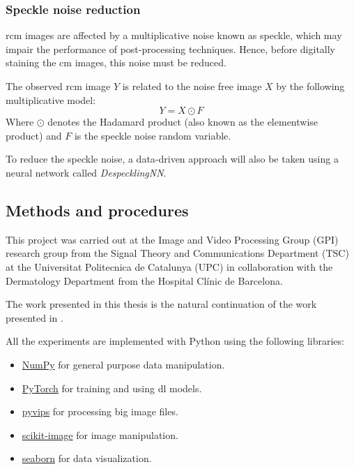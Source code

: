 \documentclass[../main.tex]{subfiles}
\begin{document}
\subsubsection{Speckle noise reduction}\label{sec:speckle-noise}
\gls{rcm} images are affected by a multiplicative noise known as speckle,
which may impair the performance of post-processing techniques.
Hence, before digitally staining the \gls{cm} images, this noise must be reduced.

The observed \gls{rcm} image $Y$ is related to the noise free image $X$ by
the following multiplicative model:
\begin{equation} \label{eq:speckle-model}
	Y = X \odot F
\end{equation}
Where $\odot$ denotes the Hadamard product (also known as the elementwise product)
and $F$ is the speckle noise random variable.

To reduce the speckle noise, a data-driven approach will also be taken using
a neural network called \emph{DespecklingNN}.

\subsection{Methods and procedures}
\label{sec:methods-and-procedures}
This project was carried out at the Image and Video Processing Group (GPI) research
group from the Signal Theory and Communications Department (TSC) at the Universitat
Politecnica de Catalunya (UPC) in collaboration with the Dermatology Department from
the Hospital Clínic de Barcelona.

The work presented in this thesis is the natural continuation of the work presented
in \parencite{Combalia2019}.

All the experiments are implemented with Python using the following
libraries\footnotemark:
\begin{itemize}
\item \href{https://numpy.org/}{NumPy} for general purpose data manipulation.
\item \href{https://pytorch.org/}{PyTorch} for training and using \gls{dl} models.
\item \href{https://libvips.github.io/libvips/}{pyvips} for processing big image files.
\item \href{https://scikit-image.org/}{scikit-image} for image manipulation.
\item \href{https://seaborn.pydata.org/}{seaborn} for data visualization.
\end{itemize}
\end{document}
